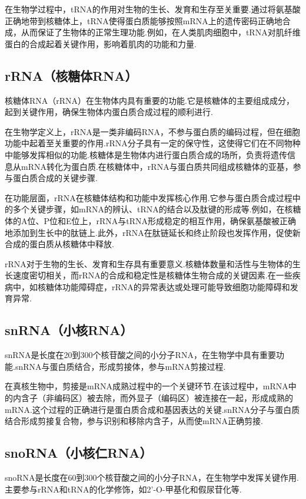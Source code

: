 在生物学过程中，tRNA的作用对生物的生长、发育和生存至关重要.通过将氨基酸正确地带到核糖体上，tRNA使得蛋白质能够按照mRNA上的遗传密码正确地合成，从而保证了生物体的正常生理功能.例如，在人类肌肉细胞中，tRNA对肌纤维蛋白的合成起着关键作用，影响着肌肉的功能和力量.



\subsection{rRNA（核糖体RNA）}
核糖体RNA（rRNA）在生物体内具有重要的功能.它是核糖体的主要组成成分，起到关键作用，确保生物体内蛋白质合成过程的顺利进行.

在生物学定义上，rRNA是一类非编码RNA，不参与蛋白质的编码过程，但在细胞功能中起着至关重要的作用.rRNA分子具有一定的保守性，这使得它们在不同物种中能够发挥相似的功能.核糖体是生物体内进行蛋白质合成的场所，负责将遗传信息从mRNA转化为蛋白质.在核糖体中，rRNA与蛋白质共同组成核糖体的亚基，参与蛋白质合成的关键步骤.

在功能层面，rRNA在核糖体结构和功能中发挥核心作用.它参与蛋白质合成过程中的多个关键步骤，如mRNA的辨认、tRNA的结合以及肽键的形成等.例如，在核糖体的A位、P位和E位上，rRNA与tRNA形成稳定的相互作用，确保氨基酸被正确地添加到生长中的肽链上.此外，rRNA在肽链延长和终止阶段也发挥作用，促使新合成的蛋白质从核糖体中释放.

rRNA对于生物的生长、发育和生存具有重要意义.核糖体数量和活性与生物体的生长速度密切相关，而rRNA的合成和稳定性是核糖体生物合成的关键因素.在一些疾病中，如核糖体功能障碍症，rRNA的异常表达或处理可能导致细胞功能障碍和发育异常.


\subsection{snRNA（小核RNA）}
snRNA是长度在20到300个核苷酸之间的小分子RNA，在生物学中具有重要功能.snRNA与蛋白质结合，形成剪接体，参与mRNA剪接过程.

在真核生物中，剪接是mRNA成熟过程中的一个关键环节.在该过程中，mRNA中的内含子（非编码区）被去除，而外显子（编码区）被连接在一起，形成成熟的mRNA.这个过程的正确进行是蛋白质合成和基因表达的关键.snRNA分子与蛋白质结合形成剪接复合物，参与识别和移除内含子，从而使mRNA正确剪接.

\subsection{snoRNA（小核仁RNA）}
snoRNA是长度在60到300个核苷酸之间的小分子RNA，在生物学中发挥关键作用.主要参与rRNA和tRNA的化学修饰，如2'-O-甲基化和假尿苷化等.


